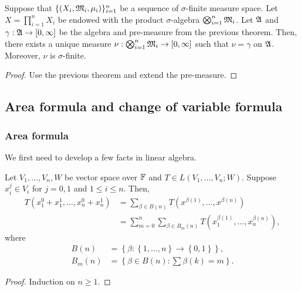 \documentclass[a4paper]{article}
\begin{document}
\begin{cor}
Suppose that $\{(X_i, \mathfrak{M}_i, \mu_i)\}_{i=1}^n$ be 
a sequence of $\sigma$-finite measure space. 
Let $X = \prod_{i=1}^n X_i$ be endowed with the product 
$\sigma$-algebra $\bigotimes_{i=1}^n \mathfrak{M}_i$. Let $\mathfrak{A}$
and $\gamma: \mathfrak{A} \to [0, \infty]$ be the algebra and 
pre-measure from the previous theorem. Then, there 
exists a unique measure $\nu: \bigotimes_{i=1}^n \mathfrak{M}_i
\to [0, \infty]$ such that $\nu = \gamma$ on $\mathfrak{A}$.
Moreover, $\nu$ is $\sigma$-finite.
\end{cor}

\begin{proof}
Use the previous theorem and extend the pre-measure.
\end{proof}

\subsection{Area formula and change of variable formula}

\subsubsection{Area formula}

We first need to develop a few facts in linear algebra.

\begin{prop}
Let $V_1, \dots, V_n, W$ be vector space over $\mathbb{F}$ 
and $T \in L(V_1, \dots, V_n ; W)$. Suppose $x_i^j \in V_i$
for $j = 0, 1$ and $1 \leq i \leq n$. Then, 
\[
\begin{aligned}
  T(x^0_1 + x^1_1, \dots, x^0_n + x^1_n)
  &= \sum_{\beta \in B(n)} 
  T(x^{\beta(1)}, \dots, x^{\beta(n)}) \\
  &= \sum_{m=0}^n \sum_{\beta \in B_m(n)} 
  T(x_1^{\beta(1)}, \dots, x_n^{\beta(n)}),
\end{aligned}
\]
where 
\[
\begin{aligned}
  B(n) &= \left\{ \beta : \left\{ 1, \dots, n \right\} 
  \to \left\{ 0, 1 \right\} \right\}, \\
  B_m(n) &= \left\{ \beta \in B(n) : 
  \sum \beta(k) = m \right\}.
\end{aligned}
\]
\end{prop}

\begin{proof}
Induction on $n \geq 1$.
\end{proof}
\end{document}
